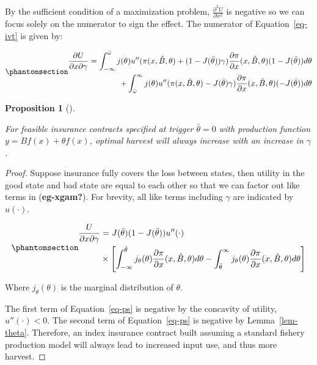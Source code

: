 \documentclass[
  letterpaper,
  DIV=11,
  numbers=noendperiod]{scrartcl}
\theoremstyle{plain}
\theoremstyle{plain}
\newtheorem{proposition}{Proposition}[section]
\theoremstyle{remark}
\begin{document}
By the sufficient condition of a maximization problem,
\(\frac{\partial^2 U}{\partial x^{2}}\) is negative so we can focus
solely on the numerator to sign the effect. The numerator of
Equation~\ref{eq-ivt} is given by:

\begin{equation}\phantomsection\label{eq-xgam}{
\begin{aligned}
\frac{\partial U}{\partial x \partial \gamma}=\int^{\bar \omega}_{-\infty}j(\theta)u''(\pi(x,\hat{B},\theta)+(1-J(\bar \theta))\gamma)\frac{\partial \pi}{\partial x}(x,\hat{B},\theta)(1-J(\bar \theta))d\theta\\
+\int^{\infty}_{\bar{\omega}}j(\theta) u''(\pi(x,\hat{B},\theta)-J(\bar \theta)\gamma)\frac{\partial \pi}{\partial x}(x,\hat{B},\theta)(-J(\bar \theta)) d\theta
\end{aligned}
}\end{equation}

\begin{proposition}[]\protect\hypertarget{prp-std}{}\label{prp-std}

For feasible insurance contracts specified at trigger \(\bar\theta=0\)
with production function \(y=Bf(x)+\theta f(x)\), optimal harvest will
always increase with an increase in \(\gamma\).

\end{proposition}

\begin{proof}
Suppose insurance fully covers the loss between states, then utility in
the good state and bad state are equal to each other so that we can
factor out like terms in (\textbf{eg-xgam?}). For brevity, all like
terms including \(\gamma\) are indicated by \(u(\cdot)\).

\begin{equation}\phantomsection\label{eq-ps}{
\begin{aligned}
\frac{U}{\partial x \partial \gamma}&=J(\bar\theta)(1-J(\bar\theta))u''(\cdot)\\
&\times\left[\int^{\bar\theta}_{-\infty}j_{\theta}(\theta)\frac{\partial \pi}{\partial x}(x,\hat{B},\theta)d\theta-\int^{\infty}_{\bar{\theta}}j_{\theta}(\theta)\frac{\partial \pi}{\partial x}(x,\hat{B},\theta)d\theta\right ]
\end{aligned}
}\end{equation}

Where \(j_\theta(\theta)\) is the marginal distribution of \(\theta\).

The first term of Equation~\ref{eq-ps} is negative by the concavity of
utility, \(u''(\cdot)<0\). The second term of Equation~\ref{eq-ps} is
negative by Lemma~\ref{lem-theta}. Therefore, an index insurance
contract built assuming a standard fishery production model will always
lead to increased input use, and thus more harvest.
\end{proof}
\end{document}
